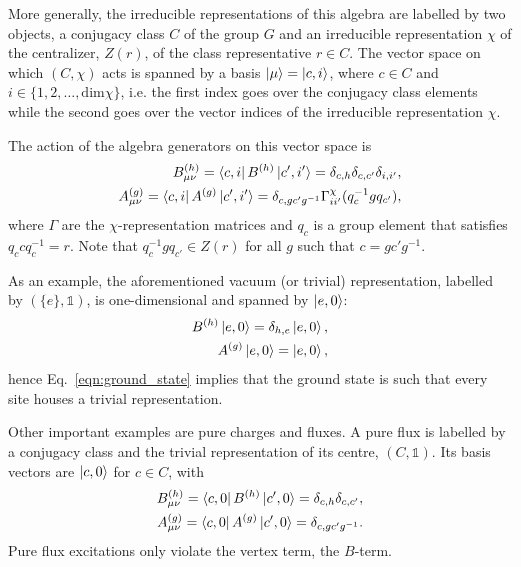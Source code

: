 \documentclass[two column]{article}
\newcommand{\caro}[1]{\textcolor{red}{[#1]}}
\begin{document}

More generally, the irreducible representations of this algebra are labelled by two objects, a conjugacy class $C$ of the group $G$ and an irreducible representation $\chi$ of the centralizer, $Z(r)$, of the class representative $r \in C$. The vector space on which $(C, \chi)$ acts is spanned by a basis $\ket{\mu} = \ket{c, i}$, where $c \in C$ and $i \in \{1, 2, \ldots, \text{dim}\chi\}$, i.e. the first index goes over the conjugacy class elements while the second goes over the vector indices of the irreducible representation $\chi$.


The action of the algebra generators on this vector space is
\begin{equation}
    \begin{split}
        B^{(h)}_{\mu\nu}=\bra{c, i} B^{(h)} \ket{c', i'} = \delta_{c, h} \delta_{c, c'}\delta_{i, i'}, \\
        A^{(g)}_{\mu\nu} = \bra{c, i} A^{(g)} \ket{c', i'} = \delta_{c,gc'g^{-1}} \Gamma^\chi_{ii'}(q_{c}^{-1}gq_{c'}),
    \end{split}
\end{equation}
where $\Gamma$ are the $\chi$-representation matrices and $q_c$ is a group element that satisfies $q_c c q_c^{-1} = r$. Note that $q_c^{-1}gq_{c'} \in Z(r)$ for all $g$ such that $c = gc'g^{-1}$.

As an example, the aforementioned vacuum (or trivial) representation, labelled by $(\{e\}, \mathbb{1})$, is one-dimensional and spanned by $\ket{e, 0}$:
\begin{equation}
    \begin{split}
        B^{(h)}\ket{e, 0} = \delta_{h,e}\ket{e, 0},\\
        A^{(g)}\ket{e, 0} = \ket{e,0},
    \end{split}
\end{equation}
hence Eq.~\eqref{eqn:ground_state} implies that the ground state is such that every site houses a trivial representation.

Other important examples are pure charges and fluxes. A pure flux is labelled by a conjugacy class and the trivial representation of its centre, $(C, \mathbb{1})$. Its basis vectors are $\ket{c, 0}$ for $c \in C$, with
\begin{equation}
    \begin{split}
        B^{(h)}_{\mu\nu}=\bra{c, 0} B^{(h)} \ket{c', 0} = \delta_{c, h} \delta_{c, c'}, \\
        A^{(g)}_{\mu\nu} = \bra{c, 0} A^{(g)} \ket{c', 0} = \delta_{c,gc'g^{-1}}.
    \end{split}
\end{equation}
Pure flux excitations only violate the vertex term, the $B$-term.
\end{document}
